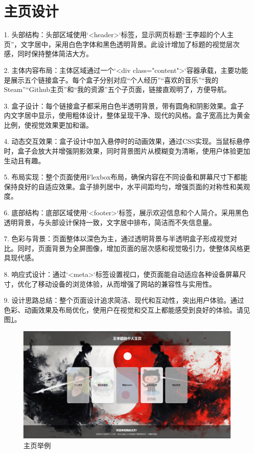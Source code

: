 \documentclass[supercite]{Experimental_Report}
\theoremstyle{definition}
\begin{document}
\newpage

\section{主页设计}

1. 头部结构：头部区域使用`<header>`标签，显示网页标题“王李超的个人主页”，文字居中，采用白色字体和黑色透明背景。此设计增加了标题的视觉层次感，同时保持整体简洁大方。

2. 主体内容布局：主体区域通过一个`<div class="content">`容器承载，主要功能是展示五个链接盒子。每个盒子分别对应“个人经历”“喜欢的音乐”“我的Steam”“Github主页”和“我的资源”五个子页面，链接直观明了，方便导航。

3. 盒子设计：每个链接盒子都采用白色半透明背景，带有圆角和阴影效果。盒子内文字居中显示，使用粗体设计，整体呈现干净、现代的风格。盒子宽高比为黄金比例，使视觉效果更加和谐。

4. 动态交互效果：盒子设计中加入悬停时的动画效果，通过CSS实现。当鼠标悬停时，盒子会放大并增强阴影效果，同时背景图片从模糊变为清晰，使用户体验更加生动且有趣。

5. 布局实现：整个页面使用Flexbox布局，确保内容在不同设备和屏幕尺寸下都能保持良好的自适应效果。盒子排列居中，水平间距均匀，增强页面的对称性和美观度。

6. 底部结构：底部区域使用`<footer>`标签，展示欢迎信息和个人简介。采用黑色透明背景，与头部设计保持一致，文字居中排布，简洁而不失信息量。

7. 色彩与背景：页面整体以深色为主，通过透明背景与半透明盒子形成视觉对比。同时，页面背景为全屏图像，增加页面的层次感和视觉吸引力，使整体风格更具现代感。

8. 响应式设计：通过`<meta>`标签设置视口，使页面能自动适应各种设备屏幕尺寸，优化了移动设备的浏览体验，从而增强了网站的兼容性与实用性。

9. 设计思路总结：整个页面设计追求简洁、现代和互动性，突出用户体验。通过色彩、动画效果及布局优化，使用户在视觉和交互上都能感受到良好的体验。请见图\ref{fig2-1}。


\begin{figure}[htb]
	\begin{center}
		\includegraphics[scale=0.30]{images/2-1.png}
		\caption{主页举例}
		\label{fig2-1}
	\end{center}
\end{figure}
\end{document}
